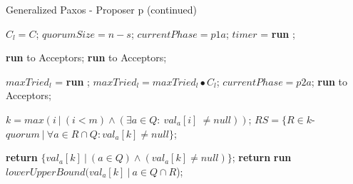\begin{algorithm}
\caption{Generalized Paxos - Proposer p (continued)}
\begin{algorithmic}[1]
        \State $C_l = C$;
        \State $quorumSize = n-s$;
        \State $currentPhase = p1a$;
        \State $timer$ = \textbf{run} ;
        
        \State
            \State \textbf{run}  to Acceptors;
        \Else
            \State \textbf{run}  to Acceptors;
        \EndIf
    \EndFunction
    
    \State
        \State $maxTried_l$ = \textbf{run} ;
        \State $maxTried_l = maxTried_l \bullet C_l$;
        \State $currentPhase = p2a$;
        \State \textbf{run}  to Acceptors;
    \EndFunction
    
    \State
        \State $k = max(i\ |\ (i < m) \wedge (\exists a \in Q :\ val_a[i]\ \neq null))$;
        \State $RS = \{R \in k$-$quorum\ |\ \forall a \in R \cap Q : val_a[k] \neq null\}$;
        
        \State
            \State \textbf{return} $\{val_a[k]\ |\ (a \in Q) \wedge (val_a[k] \neq null)\}$;
        \Else
            \State \textbf{return} \textbf{run} $lowerUpperBound(val_a[k]\ |\ a \in Q \cap R$);
        \EndIf
    \EndFunction
        
\end{algorithmic}
\end{algorithm}

